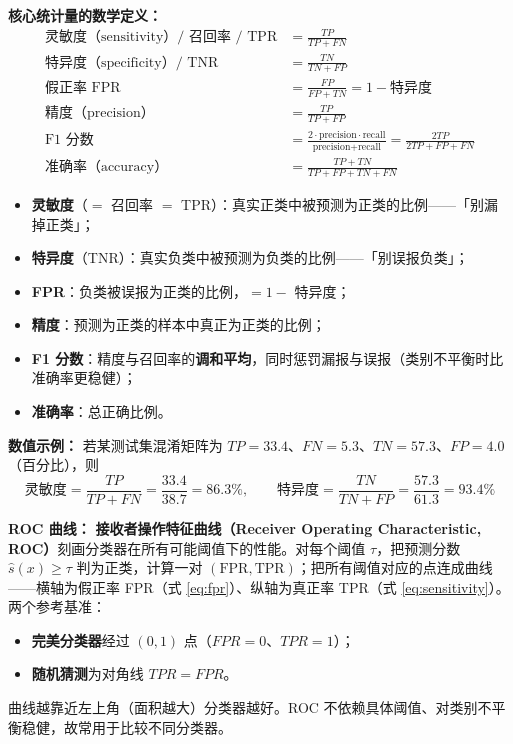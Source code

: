 \textbf{核心统计量的数学定义：}
\begin{align}
    \text{灵敏度（sensitivity）/ 召回率 / TPR} &= \frac{TP}{TP + FN} \label{eq:sensitivity}\\[2pt]
    \text{特异度（specificity）/ TNR} &= \frac{TN}{TN + FP} \label{eq:specificity}\\[2pt]
    \text{假正率 FPR} &= \frac{FP}{FP + TN} = 1 - \text{特异度} \label{eq:fpr}\\[2pt]
    \text{精度（precision）} &= \frac{TP}{TP + FP} \label{eq:precision}\\[2pt]
    \text{F1 分数} &= \frac{2 \cdot \text{precision} \cdot \text{recall}}{\text{precision} + \text{recall}} = \frac{2TP}{2TP + FP + FN} \label{eq:f1}\\[2pt]
    \text{准确率（accuracy）} &= \frac{TP + TN}{TP + FP + TN + FN} \label{eq:accuracy}
\end{align}
\begin{itemize}
    \item \textbf{灵敏度}（$=$ 召回率 $=$ TPR）：真实正类中被预测为正类的比例——「别漏掉正类」；
    \item \textbf{特异度}（TNR）：真实负类中被预测为负类的比例——「别误报负类」；
    \item \textbf{FPR}：负类被误报为正类的比例，$= 1 - $ 特异度；
    \item \textbf{精度}：预测为正类的样本中真正为正类的比例；
    \item \textbf{F1 分数}：精度与召回率的\textbf{调和平均}，同时惩罚漏报与误报（类别不平衡时比准确率更稳健）；
    \item \textbf{准确率}：总正确比例。
\end{itemize}

\textbf{数值示例：} 若某测试集混淆矩阵为 $TP = 33.4$、$FN = 5.3$、$TN = 57.3$、$FP = 4.0$（百分比），则
\[
    \text{灵敏度} = \frac{TP}{TP+FN} = \frac{33.4}{38.7} = 86.3\%,\qquad
    \text{特异度} = \frac{TN}{TN+FP} = \frac{57.3}{61.3} = 93.4\%
\]

\textbf{ROC 曲线：} \textbf{接收者操作特征曲线（Receiver Operating Characteristic, ROC）}刻画分类器在所有可能阈值下的性能。对每个阈值 $\tau$，把预测分数 $\hat s(x) \ge \tau$ 判为正类，计算一对 $(\mathrm{FPR}, \mathrm{TPR})$；把所有阈值对应的点连成曲线——横轴为假正率 FPR（式 \eqref{eq:fpr}）、纵轴为真正率 TPR（式 \eqref{eq:sensitivity}）。两个参考基准：
\begin{itemize}
    \item \textbf{完美分类器}经过 $(0,1)$ 点（$FPR = 0$、$TPR = 1$）；
    \item \textbf{随机猜测}为对角线 $TPR = FPR$。
\end{itemize}
曲线越靠近左上角（面积越大）分类器越好。ROC 不依赖具体阈值、对类别不平衡稳健，故常用于比较不同分类器。


